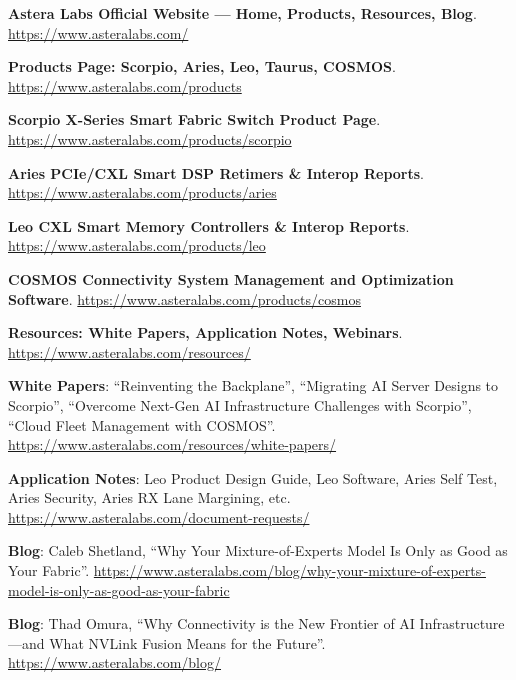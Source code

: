 \begin{enumerate}[label={[T2-\arabic*]}, leftmargin=*, resume]
    \item \textbf{Astera Labs Official Website — Home, Products, Resources, Blog}.
    \url{https://www.asteralabs.com/}

    \item \textbf{Products Page: Scorpio, Aries, Leo, Taurus, COSMOS}.
    \url{https://www.asteralabs.com/products}

    \item \textbf{Scorpio X-Series Smart Fabric Switch Product Page}.
    \url{https://www.asteralabs.com/products/scorpio}

    \item \textbf{Aries PCIe/CXL Smart DSP Retimers \& Interop Reports}.
    \url{https://www.asteralabs.com/products/aries}

    \item \textbf{Leo CXL Smart Memory Controllers \& Interop Reports}.
    \url{https://www.asteralabs.com/products/leo}

    \item \textbf{COSMOS Connectivity System Management and Optimization Software}.
    \url{https://www.asteralabs.com/products/cosmos}

    \item \textbf{Resources: White Papers, Application Notes, Webinars}.
    \url{https://www.asteralabs.com/resources/}

    \item \textbf{White Papers}: ``Reinventing the Backplane'', ``Migrating AI Server Designs to Scorpio'',
    ``Overcome Next-Gen AI Infrastructure Challenges with Scorpio'', ``Cloud Fleet Management with COSMOS''.
    \url{https://www.asteralabs.com/resources/white-papers/}

    \item \textbf{Application Notes}: Leo Product Design Guide, Leo Software, Aries Self Test,
    Aries Security, Aries RX Lane Margining, etc.
    \url{https://www.asteralabs.com/document-requests/}

    \item \textbf{Blog}: Caleb Shetland, ``Why Your Mixture-of-Experts Model Is Only as Good as Your Fabric''.
    \url{https://www.asteralabs.com/blog/why-your-mixture-of-experts-model-is-only-as-good-as-your-fabric}

    \item \textbf{Blog}: Thad Omura, ``Why Connectivity is the New Frontier of AI Infrastructure—and What NVLink Fusion Means for the Future''.
    \url{https://www.asteralabs.com/blog/}


\end{enumerate}
